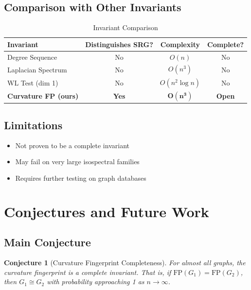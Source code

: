 \documentclass[12pt,a4paper]{article}
\newtheorem{conjecture}[theorem]{Conjecture}
\begin{document}
\subsection{Comparison with Other Invariants}

\begin{table}[h]
\centering
\caption{Invariant Comparison}
\label{tab:comparison}
\begin{tabular}{lccc}
\toprule
Invariant & Distinguishes SRG? & Complexity & Complete? \\
\midrule
Degree Sequence & No & $O(n)$ & No \\
Laplacian Spectrum & No & $O(n^3)$ & No \\
WL Test (dim 1) & No & $O(n^2 \log n)$ & No \\
\textbf{Curvature FP (ours)} & \textbf{Yes} & $\mathbf{O(n^3)}$ & \textbf{Open} \\
\bottomrule
\end{tabular}
\end{table}

\subsection{Limitations}

\begin{itemize}
  \item Not proven to be a complete invariant
  \item May fail on very large isospectral families
  \item Requires further testing on graph databases
\end{itemize}

\section{Conjectures and Future Work}

\subsection{Main Conjecture}

\begin{conjecture}[Curvature Fingerprint Completeness]
For almost all graphs, the curvature fingerprint is a complete invariant. That is, if $\text{FP}(G_1) = \text{FP}(G_2)$, then $G_1 \cong G_2$ with probability approaching 1 as $n \to \infty$.
\end{conjecture}
\end{document}
